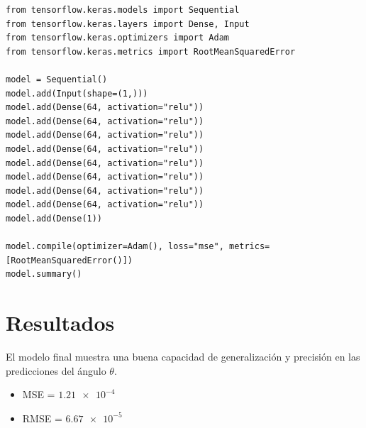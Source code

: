 \documentclass[a4paper,12pt]{article}
\begin{document}
\begin{verbatim}
from tensorflow.keras.models import Sequential
from tensorflow.keras.layers import Dense, Input
from tensorflow.keras.optimizers import Adam
from tensorflow.keras.metrics import RootMeanSquaredError

model = Sequential()
model.add(Input(shape=(1,)))
model.add(Dense(64, activation="relu"))
model.add(Dense(64, activation="relu"))
model.add(Dense(64, activation="relu"))
model.add(Dense(64, activation="relu"))
model.add(Dense(64, activation="relu"))
model.add(Dense(64, activation="relu"))
model.add(Dense(64, activation="relu"))
model.add(Dense(64, activation="relu"))
model.add(Dense(1))

model.compile(optimizer=Adam(), loss="mse", metrics=[RootMeanSquaredError()])
model.summary()
\end{verbatim}

\section{Resultados}
El modelo final muestra una buena capacidad de generalización y precisión en las predicciones del ángulo \(\theta\).
\begin{itemize}
    \item MSE = \(\qty{1.21e-4}{}\)
    \item RMSE = \(\qty{6.67e-5}{}\)
\end{itemize}
\end{document}
